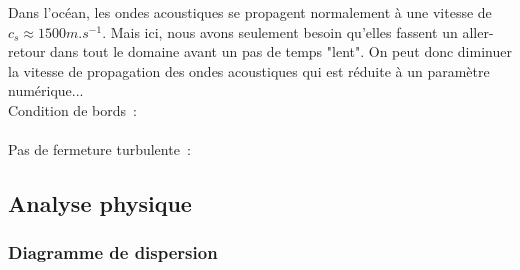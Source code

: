 \documentclass[a4paper,12pt]{article}
\begin{document}
    Dans l'océan, les ondes acoustiques se propagent normalement à une vitesse de $c_s \approx 1500 m.s^{-1}$. Mais ici, nous avons seulement besoin qu'elles fassent un aller-retour dans tout le domaine avant un pas de temps "lent". On peut donc diminuer la vitesse de propagation des ondes acoustiques qui est réduite à un paramètre numérique... \\
    \newline
    Condition de bords :\\
     \\
    \newline
    Pas de fermeture turbulente :\\

    \subsection{Analyse physique}
    
        \subsubsection{Diagramme de dispersion}
        
\end{document}
